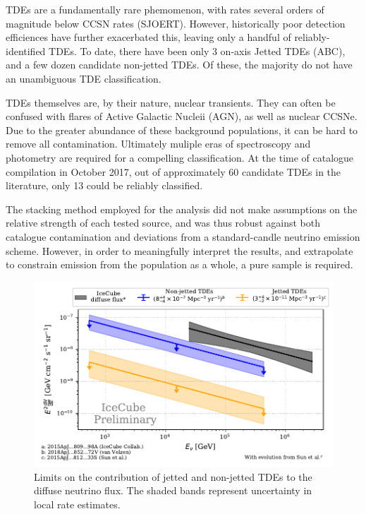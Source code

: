 \documentclass[]{article}
\begin{document}
	TDEs are a fundamentally rare phemomenon, with rates several orders of magnitude below CCSN rates (SJOERT). However, historically poor detection efficiences have further exacerbated this, leaving only a handful of reliably-identified TDEs. To date, there have been only 3 on-axis Jetted TDEs (ABC), and a few dozen candidate non-jetted TDEs. Of these, the majority do not have an unambiguous TDE classification. 
	
	TDEs themselves are, by their nature, nuclear transients. They can often be confused with flares of Active Galactic Nucleii (AGN), as well as nuclear CCSNe. Due to the greater abundance of these background populations, it can be hard to remove all contamination. Ultimately muliple eras of spectroscopy and photometry are required for a compelling classification. At the time of catalogue compilation in October 2017, out of approximately 60 candidate TDEs in the literature, only 13 could be reliably classified. 
	
	The stacking method employed for the analysis did not make assumptions on the relative strength of each tested source, and was thus robust against both catalogue contamination and deviations from a standard-candle neutrino emission scheme. However, in order to meaningfully interpret the results, and extrapolate to constrain emission from the population as a whole, a pure sample is required. 
	
	\begin{figure}[!ht]
		\centering \includegraphics[width=\textwidth]{figures/diffuse_flux_global_fit}
		\caption{Limits on the contribution of jetted and non-jetted TDEs to the diffuse neutrino flux. The shaded bands represent uncertainty in local rate estimates.}
		\label{fig:DiffuseFlux}
	\end{figure}
	
\end{document}
